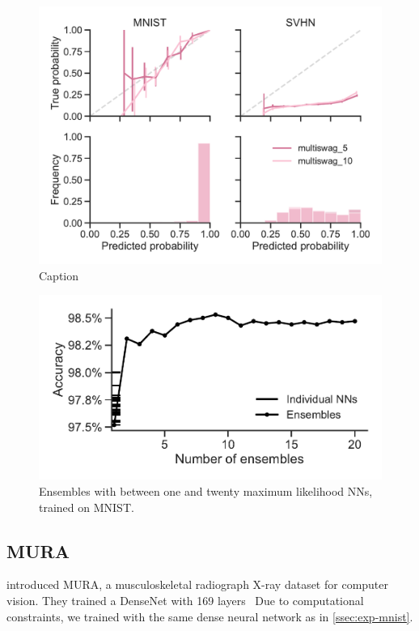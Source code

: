 \documentclass[10pt,a4paper,twocolumn]{article}
\begin{document}
\begin{figure}
    \centering
    \includegraphics[width=\linewidth]{figures/MnistMultiSwag.pdf}
    \caption{Caption}
    \label{fig:cross-calibration-multiswag}
\end{figure}

\begin{figure}
    \centering
    \includegraphics[width=\linewidth]{figures/ensemble_comparison.pdf}
    \caption{Ensembles with between one and twenty maximum likelihood NNs, trained on MNIST.}
    \label{fig:ensembles}
\end{figure}


\subsection{MURA}\label{ssec:mura}

\textcite{rajpurkar2017mura} introduced MURA, a musculoskeletal radiograph X-ray dataset for computer vision.
They trained a DenseNet with 169 layers~\cite{huang2017densely}
Due to computational constraints, we trained with the same dense neural network as in \cref{ssec:exp-mnist}.
\end{document}
